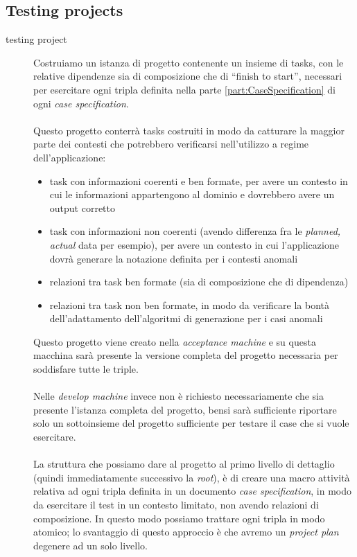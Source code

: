 \subsection{Testing projects}
\begin{description}
\item[testing project] Costruiamo un istanza di progetto contenente un insieme
di tasks, con le relative dipendenze sia di composizione che di ``finish to start'', necessari per
esercitare ogni tripla definita nella parte \ref{part:CaseSpecification} di 
ogni \emph{case specification}.
\\ \\
Questo progetto conterr\`a tasks costruiti in modo da catturare la maggior
parte dei contesti che potrebbero verificarsi nell'utilizzo a regime
dell'applicazione:
\begin{itemize}
  \item task con informazioni coerenti e ben formate, per avere un contesto in
  cui le informazioni appartengono al dominio e dovrebbero avere un output
  corretto
  \item task con informazioni non coerenti (avendo differenza fra le
  \emph{planned, actual} data per esempio), per avere un contesto in cui
  l'applicazione dovr\`a generare la notazione definita per i contesti anomali
  \item relazioni tra task ben formate (sia di composizione che di dipendenza)
  \item relazioni tra task non ben formate, in modo da verificare la bont\`a
  dell'adattamento dell'algoritmi di generazione per i casi anomali
\end{itemize} 
Questo progetto viene creato nella \emph{acceptance
machine} e su questa macchina sar\`a presente la versione completa del progetto necessaria per
soddisfare tutte le triple. 
\\ \\
Nelle \emph{develop machine} invece non \`e
richiesto necessariamente che sia presente l'istanza completa del progetto,
bensi sar\`a sufficiente riportare solo un sottoinsieme del progetto
sufficiente per testare il case che si vuole esercitare.
\\ \\
La struttura che possiamo dare al progetto al primo livello di dettaglio
(quindi immediatamente successivo la \emph{root}), \`e di creare una macro
attivit\`a relativa ad ogni tripla definita in un documento \emph{case
specification}, in modo da esercitare il test in un contesto limitato, non
avendo relazioni di composizione. In questo modo possiamo trattare ogni tripla
in modo atomico; lo svantaggio di questo approccio \`e che avremo un
\emph{project plan} degenere ad un solo livello.
 

\end{description}

